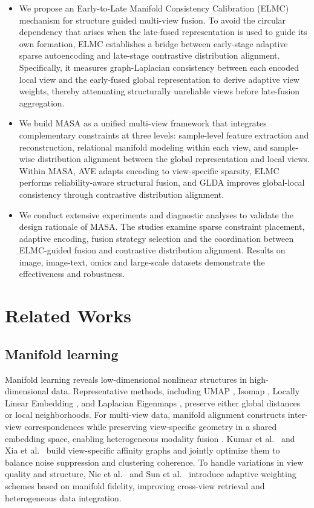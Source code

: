 \documentclass[10pt, journal, compsoc]{IEEEtran}
\begin{document}
\begin{itemize}[leftmargin=*]
   \item[\ding{182}] We propose an Early-to-Late Manifold Consistency Calibration (ELMC) mechanism for structure guided multi-view fusion. To avoid the circular dependency that arises when the late-fused representation is used to guide its own formation, ELMC establishes a bridge between early-stage adaptive sparse autoencoding and late-stage contrastive distribution alignment. Specifically, it measures graph-Laplacian consistency between each encoded local view and the early-fused global representation to derive adaptive view weights, thereby attenuating structurally unreliable views before late-fusion aggregation.

   \item[\ding{183}] We build MASA as a unified multi-view framework that integrates complementary constraints at three levels: sample-level feature extraction and reconstruction, relational manifold modeling within each view, and sample-wise distribution alignment between the global representation and local views. Within MASA, AVE adapts encoding to view-specific sparsity, ELMC performs reliability-aware structural fusion, and GLDA improves global-local consistency through contrastive distribution alignment.

   \item[\ding{184}] We conduct extensive experiments and diagnostic analyses to validate the design rationale of MASA. The studies examine sparse constraint placement, adaptive encoding, fusion strategy selection and the coordination between ELMC-guided fusion and contrastive distribution alignment. Results on image, image-text, omics and large-scale datasets demonstrate the effectiveness and robustness.
\end{itemize}

\section{Related Works}
\subsection{Manifold learning}
Manifold learning reveals low-dimensional nonlinear structures in high-dimensional data. Representative methods, including UMAP \cite{mcinnes2018umap}, Isomap \cite{11tenenbaum2000global}, Locally Linear Embedding \cite{12roweis2000nonlinear}, and Laplacian Eigenmaps \cite{13belkin2001laplacian}, preserve either global distances or local neighborhoods. For multi-view data, manifold alignment constructs inter-view correspondences while preserving view-specific geometry in a shared embedding space, enabling heterogeneous modality fusion \cite{14wang2008manifold,15hong2015multi}. Kumar et al.\ \cite{kumar2011co} and Xia et al.\ \cite{17xia2014robust} build view-specific affinity graphs and jointly optimize them to balance noise suppression and clustering coherence. To handle variations in view quality and structure, Nie et al.\ \cite{18nie2014clustering} and Sun et al.\ \cite{19sun2010canonical} introduce adaptive weighting schemes based on manifold fidelity, improving cross-view retrieval and heterogeneous data integration.
\end{document}
